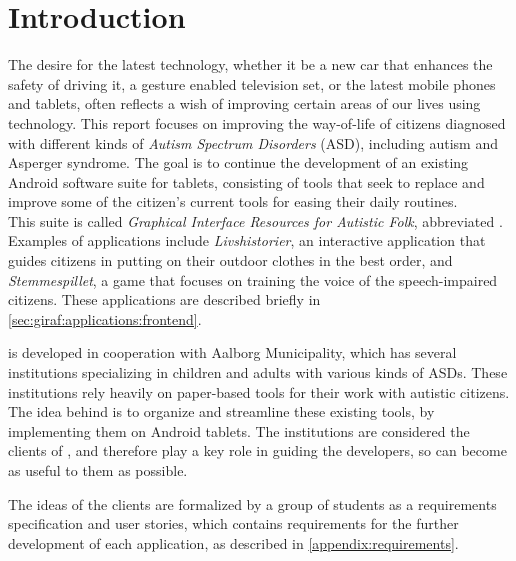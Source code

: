 \newcommand{\headerIntroduction}{Introduction}
\chapter*{\headerIntroduction}\label{chap:introduction}
\addcontentsline{toc}{chapter}{\headerIntroduction}

The desire for the latest technology, whether it be a new car that enhances the safety of driving it, a gesture enabled television set, or the latest mobile phones and tablets, often reflects a wish of improving certain areas of our lives using technology.
This report focuses on improving the way-of-life of citizens diagnosed with different kinds of \textit{Autism Spectrum Disorders} (ASD), including autism and Asperger syndrome.
The goal is to continue the development of an existing Android software suite for tablets, consisting of tools that seek to replace and improve some of the citizen's current tools for easing their daily routines. \\

This suite is called \textit{Graphical Interface Resources for Autistic Folk}, abbreviated \giraf.\\

Examples of \giraf applications include \textit{Livshistorier}, an interactive application that guides citizens in putting on their outdoor clothes in the best order, and \textit{Stemmespillet}, a game that focuses on training the voice of the speech-impaired citizens.
These applications are described briefly in \cref{sec:giraf:applications:frontend}.

\giraf is developed in cooperation with Aalborg Municipality, which has several institutions specializing in children and adults with various kinds of ASDs.
These institutions rely heavily on paper-based tools for their work with autistic citizens.
The idea behind \giraf is to organize and streamline these existing tools, by implementing them on Android tablets.
The institutions are considered the clients of \giraf, and therefore play a key role in guiding the developers, so \giraf can become as useful to them as possible.

The ideas of the clients are formalized by a group of students as a requirements specification and user stories, which contains requirements for the further development of each application, as described in \cref{appendix:requirements}.